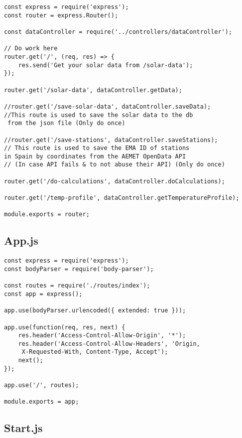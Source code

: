 \begin{lstlisting}[style=ES6, caption={Server/routes/index.js}]
const express = require('express');
const router = express.Router();

const dataController = require('../controllers/dataController');

// Do work here
router.get('/', (req, res) => {
	res.send('Get your solar data from /solar-data');
});

router.get('/solar-data', dataController.getData);

//router.get('/save-solar-data', dataController.saveData);
//This route is used to save the solar data to the db
 from the json file (Only do once)

//router.get('/save-stations', dataController.saveStations);
// This route is used to save the EMA ID of stations 
in Spain by coordinates from the AEMET OpenData API
// (In case API fails & to not abuse their API) (Only do once)

router.get('/do-calculations', dataController.doCalculations);

router.get('/temp-profile', dataController.getTemperatureProfile);

module.exports = router;
\end{lstlisting}

\subsection{App.js}

\begin{lstlisting}[style=ES6, caption={Server/App.js}]
const express = require('express');
const bodyParser = require('body-parser');

const routes = require('./routes/index');
const app = express();

app.use(bodyParser.urlencoded({ extended: true }));

app.use(function(req, res, next) {
	res.header('Access-Control-Allow-Origin', '*');
	res.header('Access-Control-Allow-Headers', 'Origin,
	 X-Requested-With, Content-Type, Accept');
	next();
});

app.use('/', routes);

module.exports = app;
\end{lstlisting}

\subsection{Start.js}

